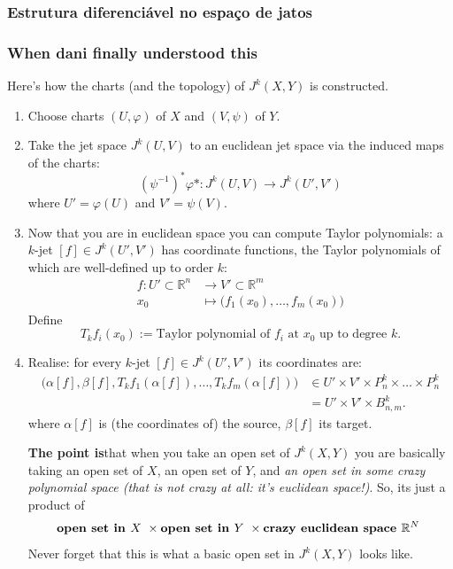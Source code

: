 \clearpage
\subsubsection{Estrutura diferenciável no espaço de jatos}

\subsubsection{When dani finally understood this}

Here's how the charts (and the topology) of \(J^k(X,Y)\) is constructed.
\begin{enumerate}
\item Choose charts \((U,\varphi)\) of \(X\) and \((V,\psi)\) of \(Y\).

 \item Take the jet space \(J^{k}(U,V)\) to an euclidean jet space via the induced maps of the charts:
	 \[(\psi^{-1})^*\varphi*:J^{k}(U,V)\to J^{k}(U',V')\]
	where \(U'=\varphi(U)\) and \(V'=\psi(V)\).

\item Now that you are in euclidean space you can compute Taylor polynomials: a  \(k\)-jet \([f]\in J^{k}(U',V')\) has coordinate functions, the Taylor polynomials of which are well-defined up to order \(k\):
	\begin{align*}
		f: U' \subset \mathbb{R}^n &\longrightarrow V' \subset \mathbb{R}^m \\
		x_0 &\longmapsto \Big(f_1(x_0),\ldots,f_m(x_0) \Big)
	\end{align*}
Define
\[T_kf_i(x_0):=\text{Taylor polynomial of \(f_i\) at \(x_0\) up to degree \(k\)}. \]
\item Realise: for every \(k\)-jet \([f] \in J^{k}(U',V')\) its coordinates are:
	\begin{align*}
	\Big(\alpha[f],\beta[f],T_kf_1(\alpha[f]),\ldots,T_kf_m(\alpha[f]) \Big)&\in U' \times V'\times P^k_{n}\times\ldots\times P^k_n\\
	&=U' \times V' \times B^k_{n,m}.
	\end{align*}
	where \(\alpha[f]\) is (the coordinates of) the source, \(\beta[f]\) its target.

{\color{2}\bfseries The point is}\hspace{.5em}that when you take an open set of \(J^k(X,Y)\) you are basically taking an open set of \(X\), an open set of \(Y\), and \textit{an open set in some crazy polynomial space (that is not crazy at all: it's euclidean space!)}. So, its just a product of
\[\text{\textbf{open set in \(X\)} } \times \text{\textbf{open set in \(Y\)} } \times \text{\textbf{crazy euclidean space \(\mathbb{R}^N\)} } \]
Never forget that this is what a basic open set in \(J^k(X,Y)\) looks like.
\end{enumerate}

